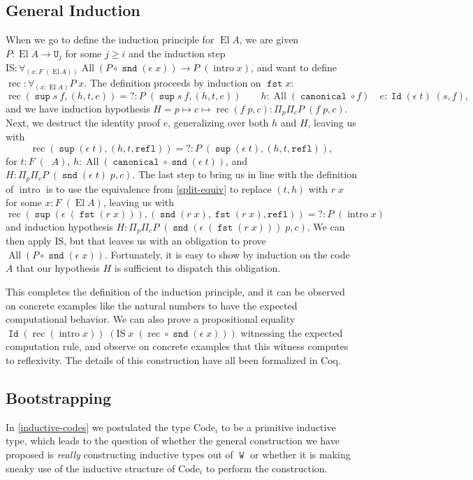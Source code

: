 \documentclass[a4paper,UKenglish,cleveref,nameinlink,autoref,thm-restate]{lipics-v2019}
\newcommand{\U}{\mathtt{U}}
\DeclareMathOperator{\supop}{\mathtt{sup}}
\renewcommand{\sup}[2]{\supop {#1}\:\!{#2}}
\DeclareMathOperator{\W}{\mathtt{W}}
\DeclareMathOperator{\Idop}{\mathtt{Id}}
\newcommand{\Id}[2]{\Idop {#1}\;{#2}}
\newcommand{\refl}{\mathtt{refl}}
\DeclareMathOperator{\fst}{\mathtt{fst}}
\DeclareMathOperator{\snd}{\mathtt{snd}}
\DeclareMathOperator{\canonical}{\hyperref[define-canonical]{\mathtt{canonical}}}
\newcommand{\IS}{\mathrm{IS}}
\newcommand{\Code}{\mathrm{Code}}
\DeclareMathOperator{\El}{El}
\DeclareMathOperator{\preEl}{\tilde{El}}
\DeclareMathOperator{\intro}{intro}
\DeclareMathOperator{\rec}{rec}
\DeclareMathOperator{\All}{All}
\newcommand{\splitequiv}{\hyperref[split-equiv]{r}}
\begin{document}
\subsection{General Induction}
When we go to define the induction principle for $\El A$, we are given $P : \El A \to \U_j$ for some $j \geq i$ and the induction step $\IS : \forall_{(x : F\;(\El A))}\All(P \circ \snd(\epsilon\;x)) \to P\;(\intro x)$, and want to define $\rec : \forall_{(x : \El A)}P\;x$. The definition proceeds by induction on $\fst x$:
\[\rec(\sup{s}{f},(h,t,e)) ={} ? : P\;(\sup{s}{f},(h,t,e))\qquad h : \All(\canonical \circ f) \quad  e : \Id{(\epsilon \;t)}{(s,f)},\] and we have induction hypothesis $H = p \mapsto c \mapsto \rec(f\;p,c) : \Pi_p\Pi_c P\;(f\;p,c)$. Next, we destruct the identity proof $e$, generalizing over both $h$ and $H$, leaving us with
\[\rec(\supop(\epsilon\;t),(h,t,\refl)) ={} ? : P\;(\supop(\epsilon\;t),(h,t,\refl)),\] for $t : F\;(\preEl A)$, $h : \All(\canonical\circ\snd(\epsilon\;t))$, and $H : \Pi_p\Pi_c P\;(\snd(\epsilon\;t)\;p,c)$. The last step to bring us in line with the definition of $\intro$ is to use the equivalence from \cref{split-equiv} to replace $(t, h)$ with $\splitequiv\;x$ for some $x : F\;(\El A)$, leaving us with
\[\rec(\supop(\epsilon\;(\fst(\splitequiv\;x))),(\snd(\splitequiv\;x),\fst(\splitequiv\;x),\refl)) ={} ? : P\;(\intro x)\]
and induction hypothesis $H : \Pi_p\Pi_c P\;(\snd(\epsilon\;(\fst(\splitequiv\;x)))\;p,c)$. We can then apply $\IS$, but that leaves us with an obligation to prove $\All (P\circ\snd(\epsilon\;x))$. Fortunately, it is easy to show by induction on the code $A$ that our hypothesis $H$ is sufficient to dispatch this obligation.

This completes the definition of the induction principle, and it can be observed on concrete examples like the natural numbers to have the expected computational behavior. We can also prove a propositional equality $\Id{(\rec(\intro x))}{(\IS\;x\;(\rec\circ \snd(\epsilon\;x)))}$ witnessing the expected computation rule, and observe on concrete examples that this witness computes to reflexivity. The details of this construction have all been formalized in Coq.

\subsection{Bootstrapping}\label{bootstrap}
In \cref{inductive-codes} we postulated the type $\Code_i$ to be a primitive inductive type, which leads to the question of whether the general construction we have proposed is \emph{really} constructing inductive types out of $\W$ or whether it is making sneaky use of the inductive structure of $\Code_i$ to perform the construction.
\end{document}
